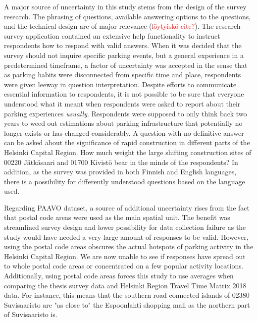 A major source of uncertainty in this study stems from the design of the survey research. The phrasing of questions, available answering options to the questions, and the technical design are of major relevance (\textcolor{red}{löytyiskö cite?}). The research survey application contained an extensive help functionality to instruct respondents how to respond with valid answers. When it was decided that the survey should not inquire specific parking events, but a general experience in a predetermined timeframe, a factor of uncertainty was accepted in the sense that as parking habits were disconnected from specific time and place, respondents were given leeway in question interpretation. Despite efforts to communicate essential information to respondents, it is not possible to be sure that everyone understood what it meant when respondents were asked to report about their parking experiences \textit{usually}. Respondents were supposed to only think back two years to weed out estimations about parking infrastructure that potentially no longer exists or has changed considerably. A question with no definitive answer can be asked about the significance of rapid construction in different parts of the Helsinki Capital Region. How much weight the large shifting construction sites of 00220 Jätkäsaari and 01700 Kivistö bear in the minds of the respondents? In addition, as the survey was provided in both Finnish and English languages, there is a possibility for differently understood questions based on the language used.

Regarding PAAVO dataset, a source of additional uncertainty rises from the fact that postal code areas were used as the main spatial unit. The benefit was streamlined survey design and lower possibility for data collection failure as the study would have needed a very large amount of responses to be valid. However, using the postal code areas obscures the actual hotspots of parking activity in the Helsinki Capital Region. We are now unable to see if responses have spread out to whole postal code areas or concentrated on a few popular activity locations. Additionally, using postal code areas forces this study to use averages when comparing the thesis survey data and Helsinki Region Travel Time Matrix 2018 data. For instance, this means that the southern road connected islands of 02380 Suvisaaristo are "as close to" the Espoonlahti shopping mall as the northern part of Suvisaaristo is.

